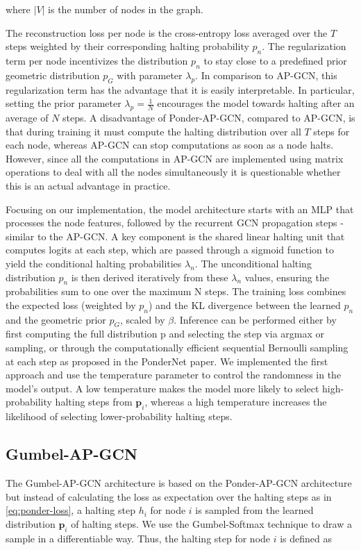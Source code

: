 \documentclass{gdl}
\begin{document}
\noindent where $|V|$ is the number of nodes in the graph.

\noindent The reconstruction loss per node is the cross-entropy loss averaged over the $T$ steps weighted by their corresponding halting probability $p_n$. The regularization term per node incentivizes the distribution $p_n$ to stay close to a predefined prior geometric distribution $p_G$ with parameter $\lambda_p$. In comparison to AP-GCN, this regularization term has the advantage that it is easily interpretable. In particular, setting the prior parameter $\lambda_p = \frac{1}{N}$ encourages the model towards halting after an average of $N$ steps. A disadvantage of Ponder-AP-GCN, compared to AP-GCN, is that during training it must compute the halting distribution over all $T$ steps for each node, whereas AP-GCN can stop computations as soon as a node halts. However, since all the computations in AP-GCN are implemented using matrix operations to deal with all the nodes simultaneously it is questionable whether this is an actual advantage in practice.

Focusing on our implementation, the model architecture starts with an MLP that processes the node features, followed by the recurrent GCN propagation steps - similar to the AP-GCN. A key component is the shared linear halting unit that computes logits at each step, which are passed through a sigmoid function to yield the conditional halting probabilities $\lambda_n$. The unconditional halting distribution $p_n$ is then derived iteratively from these $\lambda_n$  values, ensuring the probabilities sum to one over the maximum N steps. The training loss combines the expected loss (weighted by $p_n$) and the KL divergence between the learned $p_n$ and the geometric prior $p_G$, scaled by $\beta$. Inference can be performed either by first computing the full distribution p and selecting the step via argmax or sampling, or through the computationally efficient sequential Bernoulli sampling at each step as proposed in the PonderNet paper. We implemented the first approach and use the temperature parameter to control the randomness in the model's output. A low temperature makes the model more likely to select high-probability halting steps from $\mathbf{p}_i$, whereas a high temperature increases the likelihood of selecting lower-probability halting steps.

\subsection{Gumbel-AP-GCN}
The Gumbel-AP-GCN architecture is based on the Ponder-AP-GCN architecture but instead of calculating the loss as expectation over the halting steps as in \autoref{eq:ponder-loss}, a halting step $h_i$ for node $i$ is sampled from the learned distribution $\mathbf{p}_i$ of halting steps. We use the Gumbel-Softmax technique \cite{Maddison2017, Jang2017} to draw a sample in a differentiable way. Thus, the halting step for node $i$ is defined as
\end{document}
